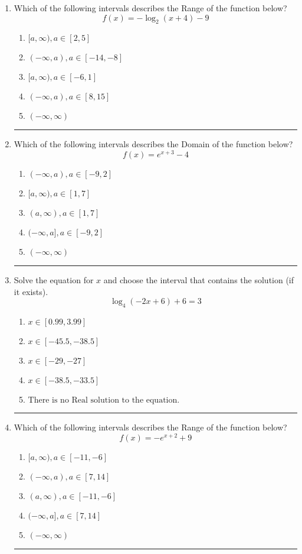 \documentclass[14pt]{extbook}
\newcommand{\litem}[1]{\item#1\hspace*{-1cm}\rule{\textwidth}{0.4pt}}
\begin{document}
\begin{enumerate}
{\begin{enumerate}[label=\Alph*.]
\end{enumerate} }
\litem{
Which of the following intervals describes the Range of the function below?\[ f(x) = -\log_2{(x+4)}-9 \]\begin{enumerate}[label=\Alph*.]
\item \( [a, \infty), a \in [2, 5] \)
\item \( (-\infty, a), a \in [-14, -8] \)
\item \( [a, \infty), a \in [-6, 1] \)
\item \( (-\infty, a), a \in [8, 15] \)
\item \( (-\infty, \infty) \)

\end{enumerate} }
\litem{
Which of the following intervals describes the Domain of the function below?\[ f(x) = e^{x+3}-4 \]\begin{enumerate}[label=\Alph*.]
\item \( (-\infty, a), a \in [-9, 2] \)
\item \( [a, \infty), a \in [1, 7] \)
\item \( (a, \infty), a \in [1, 7] \)
\item \( (-\infty, a], a \in [-9, 2] \)
\item \( (-\infty, \infty) \)

\end{enumerate} }
\litem{
Solve the equation for $x$ and choose the interval that contains the solution (if it exists).\[ \log_{4}{(-2x+6)}+6 = 3 \]\begin{enumerate}[label=\Alph*.]
\item \( x \in [0.99, 3.99] \)
\item \( x \in [-45.5, -38.5] \)
\item \( x \in [-29, -27] \)
\item \( x \in [-38.5, -33.5] \)
\item \( \text{There is no Real solution to the equation.} \)

\end{enumerate} }
\litem{
Which of the following intervals describes the Range of the function below?\[ f(x) = -e^{x+2}+9 \]\begin{enumerate}[label=\Alph*.]
\item \( [a, \infty), a \in [-11, -6] \)
\item \( (-\infty, a), a \in [7, 14] \)
\item \( (a, \infty), a \in [-11, -6] \)
\item \( (-\infty, a], a \in [7, 14] \)
\item \( (-\infty, \infty) \)


\end{enumerate}}
\end{enumerate}
\end{document}
